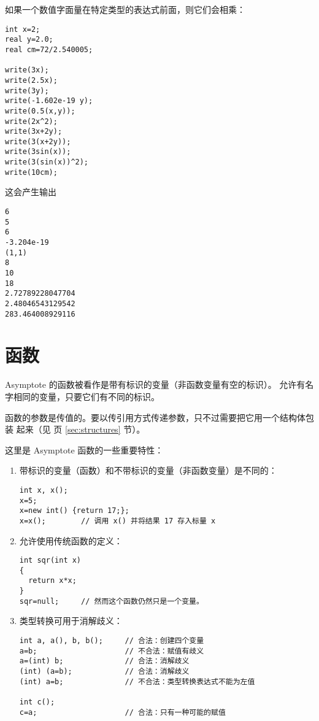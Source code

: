 \documentclass{ctexbook}
\newcommand*\prgname[1]{\textsf{#1}}
\begin{document}
{{{如果一个数值字面量在特定类型的表达式前面，则它们会相乘：
\begin{lstlisting}
int x=2;
real y=2.0;
real cm=72/2.540005;

write(3x);
write(2.5x);
write(3y);
write(-1.602e-19 y);
write(0.5(x,y));
write(2x^2);
write(3x+2y);
write(3(x+2y));
write(3sin(x));
write(3(sin(x))^2);
write(10cm);
\end{lstlisting}

这会产生输出
\begin{lstlisting}
6
5
6
-3.204e-19
(1,1)
8
10
18
2.72789228047704
2.48046543129542
283.464008929116
\end{lstlisting}


\section{函数}
\label{sec:functions}

\prgname{Asymptote} 的函数被看作是带有标识的变量（非函数变量有空的标识）。
允许有名字相同的变量，只要它们有不同的标识。

函数的参数是传值的。要以传引用方式传递参数，只不过需要把它用一个结构体包装
起来（见 \pageref{sec:structures} 页 \ref{sec:structures} 节）。

这里是 \prgname{Asymptote} 函数的一些重要特性：
\begin{enumerate}
\item 带标识的变量（函数）和不带标识的变量（非函数变量）是不同的：
\begin{lstlisting}
int x, x();
x=5;
x=new int() {return 17;};
x=x();        // 调用 x() 并将结果 17 存入标量 x
\end{lstlisting}

\item 允许使用传统函数的定义：
\begin{lstlisting}
int sqr(int x)
{
  return x*x;
}
sqr=null;     // 然而这个函数仍然只是一个变量。
\end{lstlisting}

\item 类型转换可用于消解歧义：
\begin{lstlisting}
int a, a(), b, b();     // 合法：创建四个变量
a=b;                    // 不合法：赋值有歧义
a=(int) b;              // 合法：消解歧义
(int) (a=b);            // 合法：消解歧义
(int) a=b;              // 不合法：类型转换表达式不能为左值

int c();
c=a;                    // 合法：只有一种可能的赋值
\end{lstlisting}


\end{enumerate}}}}
\end{document}
